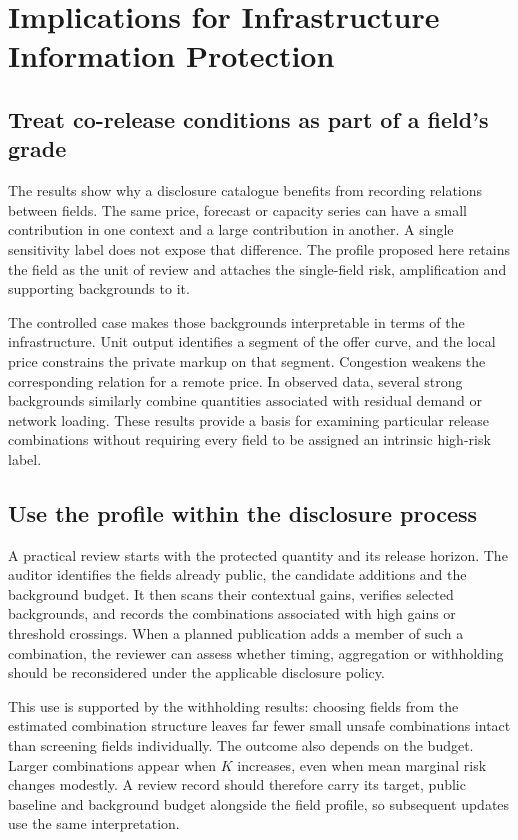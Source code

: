 \section{Implications for Infrastructure Information Protection}\label{sec:discussion}
\subsection{Treat co-release conditions as part of a field's grade}
The results show why a disclosure catalogue benefits from recording relations between fields. The same price, forecast or capacity series can have a small contribution in one context and a large contribution in another. A single sensitivity label does not expose that difference. The profile proposed here retains the field as the unit of review and attaches the single-field risk, amplification and supporting backgrounds to it.

The controlled case makes those backgrounds interpretable in terms of the infrastructure. Unit output identifies a segment of the offer curve, and the local price constrains the private markup on that segment. Congestion weakens the corresponding relation for a remote price. In observed data, several strong backgrounds similarly combine quantities associated with residual demand or network loading. These results provide a basis for examining particular release combinations without requiring every field to be assigned an intrinsic high-risk label.

\subsection{Use the profile within the disclosure process}
A practical review starts with the protected quantity and its release horizon. The auditor identifies the fields already public, the candidate additions and the background budget. It then scans their contextual gains, verifies selected backgrounds, and records the combinations associated with high gains or threshold crossings. When a planned publication adds a member of such a combination, the reviewer can assess whether timing, aggregation or withholding should be reconsidered under the applicable disclosure policy.

This use is supported by the withholding results: choosing fields from the estimated combination structure leaves far fewer small unsafe combinations intact than screening fields individually. The outcome also depends on the budget. Larger combinations appear when $K$ increases, even when mean marginal risk changes modestly. A review record should therefore carry its target, public baseline and background budget alongside the field profile, so subsequent updates use the same interpretation.

